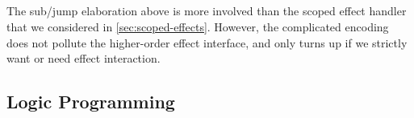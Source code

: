 \begin{code}[hide]
\\
\>[0]\AgdaComment{--\ }\<%
\\
\>[0]\<%
\\
\>[0]\<%
\\
\>[0]\<%
\\
\>[0]\<%
\\
\>[0]\<%
\\
\>[0]\<%
\\
\>[0]\<%
\\
\>[0]\<%
\end{code}

The sub/jump elaboration above is more involved than the scoped effect handler that we considered in \cref{sec:scoped-effects}.
However, the complicated encoding does not pollute the higher-order effect interface, and only turns up if we strictly want or need effect interaction.


\subsection{Logic Programming}

